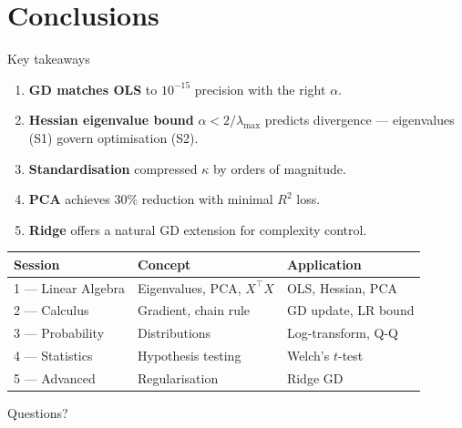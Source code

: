 \documentclass[aspectratio=169, 11pt]{beamer}
\begin{document}
\section{Conclusions}

\begin{frame}{Key takeaways}
  \begin{enumerate}
    \item \textbf{GD matches OLS} to $10^{-15}$ precision with the right $\alpha$.
    \medskip
    \item \textbf{Hessian eigenvalue bound} $\alpha < 2/\lambda_{\max}$ predicts divergence --- eigenvalues (S1) govern optimisation (S2).
    \medskip
    \item \textbf{Standardisation} compressed $\kappa$ by orders of magnitude.
    \medskip
    \item \textbf{PCA} achieves 30\% reduction with minimal $R^2$ loss.
    \medskip
    \item \textbf{Ridge} offers a natural GD extension for complexity control.
  \end{enumerate}

  \medskip
  \small
  \begin{tabular}{lll}
    \toprule
    Session & Concept & Application \\
    \midrule
    1 --- Linear Algebra & Eigenvalues, PCA, $X^\top X$ & OLS, Hessian, PCA \\
    2 --- Calculus & Gradient, chain rule & GD update, LR bound \\
    3 --- Probability & Distributions & Log-transform, Q-Q \\
    4 --- Statistics & Hypothesis testing & Welch's $t$-test \\
    5 --- Advanced & Regularisation & Ridge GD \\
    \bottomrule
  \end{tabular}
\end{frame}

\begin{frame}[plain]
  \centering
  \vfill
  {\Huge\textcolor{albert}{Questions?}}
  \vfill
\end{frame}
\end{document}
